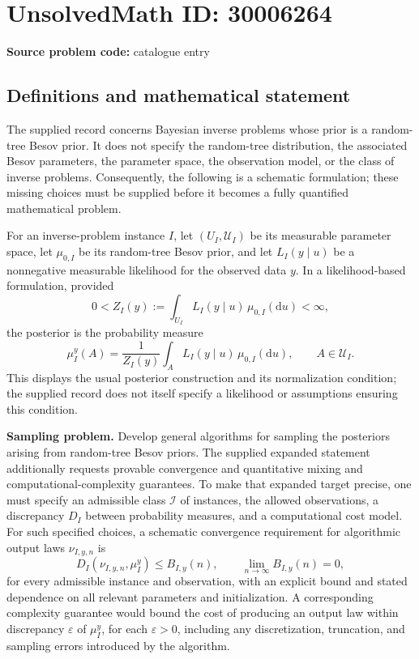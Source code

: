 \documentclass[11pt]{article}
\begin{document}
\section*{UnsolvedMath ID: 30006264}
\textbf{Source problem code:} catalogue entry
\subsection{Definitions and mathematical statement}
The supplied record concerns Bayesian inverse problems whose prior is a random-tree Besov prior. It does not specify the random-tree distribution, the associated Besov parameters, the parameter space, the observation model, or the class of inverse problems. Consequently, the following is a schematic formulation; these missing choices must be supplied before it becomes a fully quantified mathematical problem.

For an inverse-problem instance \(I\), let \((U_I,\mathcal U_I)\) be its measurable parameter space, let \(\mu_{0,I}\) be its random-tree Besov prior, and let \(L_I(y\mid u)\) be a nonnegative measurable likelihood for the observed data \(y\). In a likelihood-based formulation, provided
\[
0<Z_I(y):=\int_{U_I}L_I(y\mid u)\,\mu_{0,I}(\mathrm du)<\infty,
\]
the posterior is the probability measure
\[
\mu_I^y(A)=\frac{1}{Z_I(y)}\int_A L_I(y\mid u)\,\mu_{0,I}(\mathrm du),\qquad A\in\mathcal U_I.
\]
This displays the usual posterior construction and its normalization condition; the supplied record does not itself specify a likelihood or assumptions ensuring this condition.

\textbf{Sampling problem.} Develop general algorithms for sampling the posteriors arising from random-tree Besov priors. The supplied expanded statement additionally requests provable convergence and quantitative mixing and computational-complexity guarantees. To make that expanded target precise, one must specify an admissible class \(\mathcal I\) of instances, the allowed observations, a discrepancy \(D_I\) between probability measures, and a computational cost model. For such specified choices, a schematic convergence requirement for algorithmic output laws \(\nu_{I,y,n}\) is
\[
D_I(\nu_{I,y,n},\mu_I^y)\le B_{I,y}(n),\qquad
\lim_{n\to\infty}B_{I,y}(n)=0,
\]
for every admissible instance and observation, with an explicit bound and stated dependence on all relevant parameters and initialization. A corresponding complexity guarantee would bound the cost of producing an output law within discrepancy \(\varepsilon\) of \(\mu_I^y\), for each \(\varepsilon>0\), including any discretization, truncation, and sampling errors introduced by the algorithm.
\end{document}
